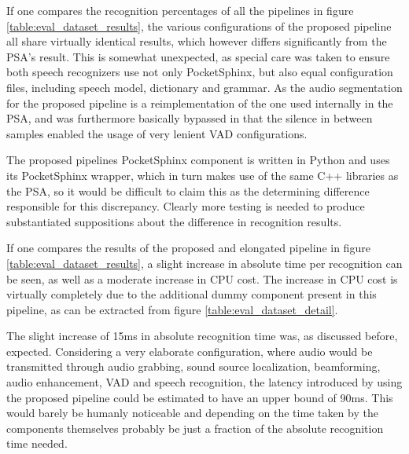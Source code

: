 
{ %
If one compares the recognition percentages of all the pipelines in figure \ref{table:eval_dataset_results}, the various configurations of the proposed pipeline all share virtually identical results, which however differs significantly from the PSA's result.
This is somewhat unexpected, as special care was taken to ensure both speech recognizers use not only PocketSphinx, but also equal configuration files, including speech model, dictionary and grammar.
As the audio segmentation for the proposed pipeline is a reimplementation of the one used internally in the PSA, and was furthermore basically bypassed in that the silence in between samples enabled the usage of very lenient VAD configurations.

The proposed pipelines PocketSphinx component is written in Python and uses its PocketSphinx wrapper, which in turn makes use of the same C++ libraries as the PSA, so it would be difficult to claim this as the determining difference responsible for this discrepancy.
Clearly more testing is needed to produce substantiated suppositions about the difference in recognition results.
}


{ %
If one compares the results of the proposed and elongated pipeline in figure \ref{table:eval_dataset_results}, a slight increase in absolute time per recognition can be seen, as well as a moderate increase in CPU cost.
The increase in CPU cost is virtually completely due to the additional dummy component present in this pipeline, as can be extracted from figure \ref{table:eval_dataset_detail}. 

The slight increase of 15ms in absolute recognition time was, as discussed before, expected.
Considering a very elaborate configuration, where audio would be transmitted through audio grabbing, sound source localization, beamforming, audio enhancement, VAD and speech recognition, the latency introduced by using the proposed pipeline could be estimated to have an upper bound of 90ms.
This would barely be humanly noticeable and depending on the time taken by the components themselves probably be just a fraction of the absolute recognition time needed.
}

